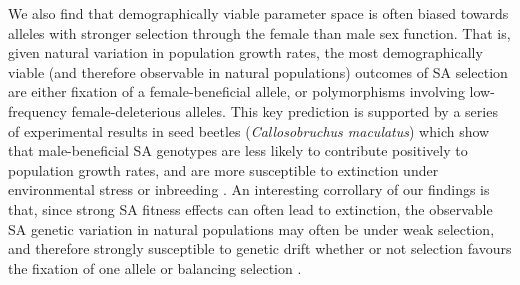 \documentclass[11pt]{article}
\begin{document}
We also find that demographically viable parameter space is often biased towards alleles with stronger selection through the female than male sex function. That is, given natural variation in population growth rates, the most demographically viable (and therefore observable in natural populations) outcomes of SA selection are either fixation of a female-beneficial allele, or polymorphisms involving low-frequency female-deleterious alleles. This key prediction is supported by a series of experimental results in seed beetles ({\itshape Callosobruchus maculatus}) which show that male-beneficial SA genotypes are less likely to contribute positively to population growth rates, and are more susceptible to extinction under environmental stress or inbreeding \citep{BergerEtAl2014, berger2016intralocus, grieshop2017male}. An interesting corrollary of our findings is that, since strong SA fitness effects can often lead to extinction, the observable SA genetic variation in natural populations may often be under weak selection, and therefore strongly susceptible to genetic drift whether or not selection favours the fixation of one allele or balancing selection \citep{ConnallonClark2012}. 

\end{document}

